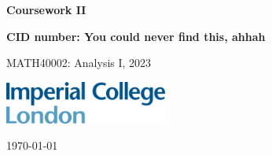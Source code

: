 \documentclass[10pt, a4paper]{article}
\begin{document}
\begin{titlepage}
    \begin{center}
        \vspace*{3cm}
            
        \Huge
        \textbf{
        Coursework II}
            
            
        \vspace{1.5cm}
        \Large
            
        \textbf{
        CID number: You could never find this, ahhah}%
        
            
        \vfill
        
    MATH40002: Analysis I, 2023
        \vspace{1cm}
            
        \includegraphics[width=0.4\textwidth]{icl_logo.png}
        \\
        
        \Large
        
        \today
            
    \end{center}
\end{titlepage}
\end{document}

